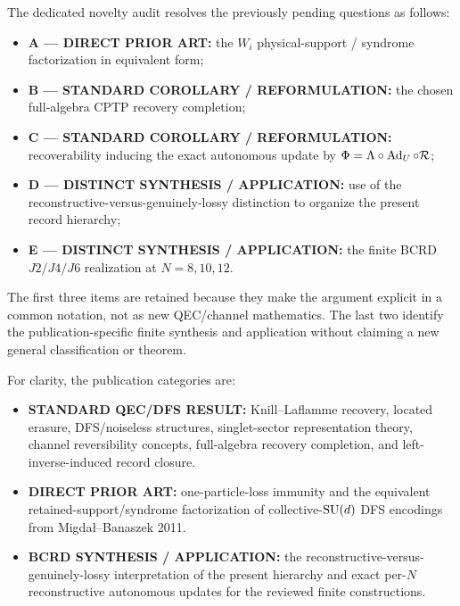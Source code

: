The dedicated novelty audit resolves the previously pending questions as follows:
\begin{itemize}
  \item \textbf{A --- DIRECT PRIOR ART:} the $W_i$ physical-support / syndrome factorization in equivalent form;
  \item \textbf{B --- STANDARD COROLLARY / REFORMULATION:} the chosen full-algebra CPTP recovery completion;
  \item \textbf{C --- STANDARD COROLLARY / REFORMULATION:} recoverability inducing the exact autonomous update by $\Phi=\Lambda\circ\operatorname{Ad}_U\circ\mathcal R$;
  \item \textbf{D --- DISTINCT SYNTHESIS / APPLICATION:} use of the reconstructive-versus-genuinely-lossy distinction to organize the present record hierarchy;
  \item \textbf{E --- DISTINCT SYNTHESIS / APPLICATION:} the finite BCRD $J2/J4/J6$ realization at $N=8,10,12$.
\end{itemize}
The first three items are retained because they make the argument explicit in a common notation, not as new QEC/channel mathematics.  The last two identify the publication-specific finite synthesis and application without claiming a new general classification or theorem.

For clarity, the publication categories are:
\begin{itemize}
  \item \textbf{STANDARD QEC/DFS RESULT:} Knill--Laflamme recovery, located erasure, DFS/noiseless structures, singlet-sector representation theory, channel reversibility concepts, full-algebra recovery completion, and left-inverse-induced record closure.
  \item \textbf{DIRECT PRIOR ART:} one-particle-loss immunity and the equivalent retained-support/syndrome factorization of collective-$\mathrm{SU}(d)$ DFS encodings from Migda\l{}--Banaszek 2011.
  \item \textbf{BCRD SYNTHESIS / APPLICATION:} the reconstructive-versus-genuinely-lossy interpretation of the present hierarchy and exact per-$N$ reconstructive autonomous updates for the reviewed finite constructions.
\end{itemize}
